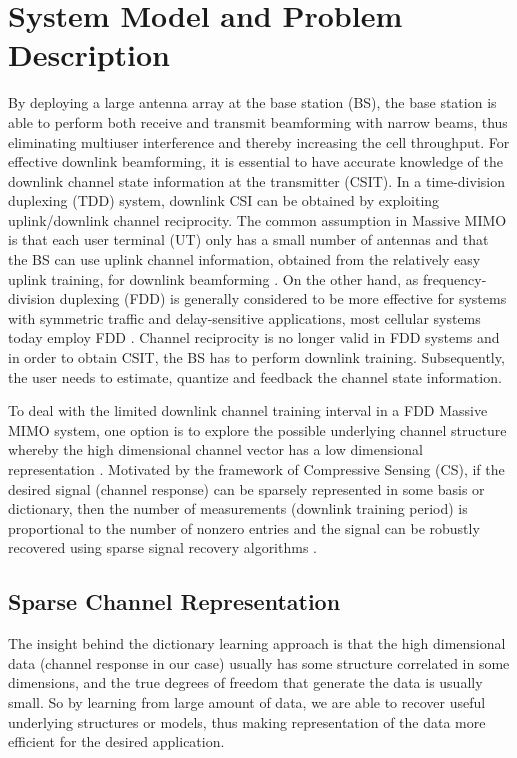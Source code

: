 \chapter{System Model and Problem Description}
\label{cha:prob_d}
By deploying a large antenna array at the base
station (BS), the base station is able to perform both receive and transmit beamforming with
narrow beams, thus eliminating multiuser interference and thereby increasing the cell throughput.
For effective downlink beamforming, it is essential to have accurate knowledge of the downlink
channel state information at the transmitter (CSIT). In a time-division duplexing (TDD) system,
downlink CSI can be obtained by exploiting uplink/downlink channel reciprocity. The common
assumption in Massive MIMO is that each user terminal (UT) only has a small number of
antennas and that the BS can use uplink channel information, obtained from the relatively
easy uplink training, for downlink beamforming  \cite{CE_FDD_ref2}. On the other hand, as frequency-division
duplexing (FDD) is generally considered to be more effective for systems with symmetric traffic
and delay-sensitive applications, most cellular systems today employ FDD \cite{CE_FDD_ref2} \cite{CE_FDD_ref5}. Channel
reciprocity is no longer valid in FDD systems and in order to obtain CSIT, the BS has to
perform downlink training. Subsequently, the user needs to estimate, quantize and feedback the
channel state information.

To deal with the limited downlink channel training interval in a FDD Massive MIMO system,
one option is to explore the possible underlying channel structure whereby the high dimensional
channel vector has a low dimensional representation \cite{CE_FDD_REF_3} \cite{CE_FDD_REF6}. Motivated by the framework of
Compressive Sensing (CS), if the desired signal (channel response) can be sparsely represented
in some basis or dictionary, then the number of measurements (downlink training period) is
proportional to the number of nonzero entries and the signal can be robustly recovered using
sparse signal recovery algorithms \cite{CE_FDD_REF_7}\cite{CE_FDD_REF_8}. 

\section{Sparse Channel Representation}
The insight behind the dictionary learning approach is that
the high dimensional data (channel response in our case) usually has some structure correlated
in some dimensions, and the true degrees of freedom that generate the data is usually small. So
by learning from large amount of data, we are able to recover useful underlying structures or
models, thus making representation of the data more efficient for the desired application. 

